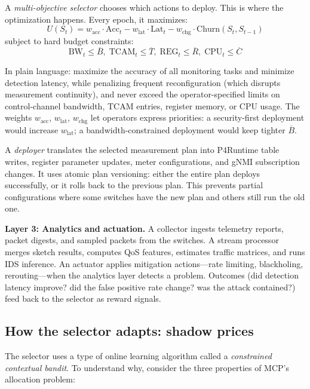 \documentclass[letterpaper,twocolumn,10pt]{article}
\newcommand{\system}{MCP\xspace}
\newcommand{\para}[1]{\smallskip\noindent\textbf{#1.}}
\begin{document}
A \emph{multi-objective selector} chooses which actions to deploy.
This is where the optimization happens. Every epoch, it
maximizes:
\begin{equation}
  \label{eq:utility}
  U(S_t) = w_{\text{acc}} \cdot \text{Acc}_t
    - w_{\text{lat}} \cdot \text{Lat}_t
    - w_{\text{chg}} \cdot \text{Churn}(S_t, S_{t-1})
\end{equation}
subject to hard budget constraints:
\begin{equation}
  \label{eq:constraints}
  \text{BW}_t \leq \overline{B},\;
  \text{TCAM}_t \leq \overline{T},\;
  \text{REG}_t \leq \overline{R},\;
  \text{CPU}_t \leq \overline{C}
\end{equation}

In plain language: maximize the accuracy of all monitoring tasks
and minimize detection latency, while penalizing frequent
reconfiguration (which disrupts measurement continuity), and
never exceed the operator-specified limits on control-channel
bandwidth, TCAM entries, register memory, or CPU usage. The
weights $w_{\text{acc}}$, $w_{\text{lat}}$, $w_{\text{chg}}$ let
operators express priorities: a security-first deployment would
increase $w_{\text{lat}}$; a bandwidth-constrained deployment
would keep tighter $\overline{B}$.

A \emph{deployer} translates the selected measurement plan into
P4Runtime table writes, register parameter updates, meter
configurations, and gNMI subscription changes. It uses atomic
plan versioning: either the entire plan deploys successfully, or
it rolls back to the previous plan. This prevents partial
configurations where some switches have the new plan and others
still run the old one.

\para{Layer 3: Analytics and actuation}
A collector ingests telemetry reports, packet digests, and
sampled packets from the switches. A stream processor merges
sketch results, computes QoS features, estimates traffic
matrices, and runs IDS inference. An actuator applies mitigation
actions---rate limiting, blackholing, rerouting---when the
analytics layer detects a problem. Outcomes (did detection
latency improve? did the false positive rate change? was the
attack contained?) feed back to the selector as reward signals.

\subsection{How the selector adapts: shadow prices}

The selector uses a type of online learning algorithm called a
\emph{constrained contextual bandit}. To understand why, consider
the three properties of \system's allocation problem:
\end{document}
